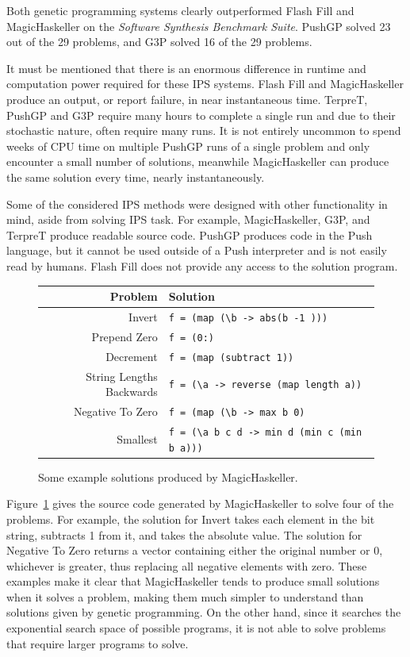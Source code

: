 Both genetic programming systems clearly outperformed Flash Fill and MagicHaskeller on the \emph{Software Synthesis Benchmark Suite}. PushGP solved  23 out of the 29 problems, and G3P solved 16 of the 29 problems.

It must be mentioned that there is an enormous difference in runtime and computation power required for these IPS systems. Flash Fill and MagicHaskeller produce an output, or report failure, in near instantaneous time. TerpreT, PushGP  and G3P require many hours to complete a single run and due to their stochastic nature, often require many runs. It is not entirely uncommon to spend weeks of CPU time on multiple PushGP runs of a single problem and only encounter a small number of solutions, meanwhile MagicHaskeller can produce the same solution every time, nearly instantaneously. 

Some of the considered IPS methods were designed with other functionality in mind, aside from solving IPS task. For example, MagicHaskeller, G3P, and TerpreT produce readable source code. PushGP produces code in the Push language, but it cannot be used outside of a Push interpreter and is not easily read by humans. Flash Fill does not provide any access to the solution program.

\begin{figure}
\begin{tabular}{ r | l }
\textbf{Problem} & \textbf{Solution} \\
\hline
Invert & \texttt{f = (map (\textbackslash b -> abs(b -1 )))} \\
Prepend Zero & \texttt{f = (0:)} \\
Decrement & \texttt{f = (map (subtract 1))} \\ 
String Lengths Backwards & \texttt{f = (\textbackslash a -> reverse (map length a))} \\
Negative To Zero & \texttt{f = (map (\textbackslash b -> max b 0)} \\
Smallest & \texttt{f = (\textbackslash a b c d -> min d (min c (min b a)))} \\
\end{tabular}
\caption{Some example solutions produced by MagicHaskeller.}
\label{fig:MHsolutions}
\end{figure}

Figure~\ref{fig:MHsolutions} gives the source code generated by MagicHaskeller to solve four of the problems. For example, the solution for Invert takes each element in the bit string, subtracts 1 from it, and takes the absolute value. The solution for Negative To Zero returns a vector containing either the original number or 0, whichever is greater, thus replacing all negative elements with zero. These examples make it clear that MagicHaskeller tends to produce small solutions when it solves a problem, making them much simpler to understand than solutions given by genetic programming. On the other hand, since it searches the exponential search space of possible programs, it is not able to solve problems that require larger programs to solve.


